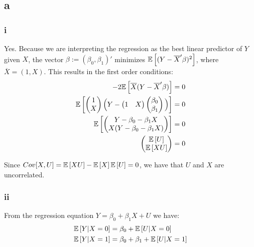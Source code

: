 \documentclass[12pt]{paper}
\begin{document}
\subsection*{a}

\subsubsection*{i}

Yes. Because we are interpreting the regression as the best linear predictor of $Y$ given $X$, the vector $\beta:=(\beta_0,\beta_1)'$ minimizes $\mathbb{E} \left [ (Y-\overline{X}'\beta)^2 \right ]$, where $\overline{X}=(1,X)$. This results in the first order conditions:
\begin{equation}
\begin{split}
-2\mathbb{E} \left [ \overline{X}(Y-\overline{X}'\beta) \right ]&=0\\
\mathbb{E} \left [ \begin{pmatrix}
1\\
X\\
\end{pmatrix}
\Big(Y-\begin{pmatrix}
1&X\\
\end{pmatrix}
\begin{pmatrix}
\beta_0\\
\beta_1\\
\end{pmatrix}\Big)
 \right ]&=0\\
\mathbb{E} \left [ \begin{pmatrix}
Y-\beta_0-\beta_1 X\\
X(Y-\beta_0-\beta_1 X)\\
\end{pmatrix}
 \right ]&=0\\
\begin{pmatrix}
\mathbb{E} \left [ U \right ]\\
\mathbb{E} \left [ XU \right ]\\
\end{pmatrix}
&=0\\
\end{split}
\end{equation}

Since $Cov[X,U]=\mathbb{E} \left [ XU \right ]-\mathbb{E} \left [ X \right ]\mathbb{E} \left [ U \right ]=0$, we have that $U$ and $X$ are uncorrelated.

\subsubsection*{ii}

From the regression equation $Y=\beta_0+\beta_1 X + U$ we have:
\begin{equation}
\begin{split}
\mathbb{E} \left [ Y|X=0 \right ]&=\beta_0+\mathbb{E} \left [ U|X=0 \right ]\\
\mathbb{E} \left [ Y|X=1 \right ]&=\beta_0+\beta_1+\mathbb{E} \left [ U|X=1 \right ]\\
\end{split}
\end{equation}
\end{document}
